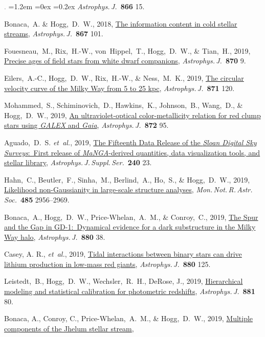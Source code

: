 \documentclass[10pt,letterpaper]{article}
\newcommand{\foreign}[1]{\textsl{#1}}
\newcommand{\etal}{\foreign{et~al.}}
\newcommand{\project}[1]{\textsl{#1}}
\newcommand{\doi}[2]{\href{http://dx.doi.org/#1}{{#2}}}
\newcommand{\deemph}[1]{\textcolor{grey}{\footnotesize{#1}}}
\newcommand{\pubnumber}[1]{\deemph{{#1}.}}
\newcounter{refpubnum}
\newcommand{\hogglist}{%
    \rightmargin=0in
    \leftmargin=1.2em
    \topsep=0ex
    \partopsep=0pt
    \itemsep=0.2ex
    \parsep=0pt
    \itemindent=-1.0\leftmargin
    \listparindent=0.0\leftmargin
    \settowidth{\labelsep}{~}
    \usecounter{refpubnum}
  }
\begin{document}
\begin{list}{\pubnumber{\therefpubnum}}{\hogglist}
\textit{Astrophys.\,J.}\ \textbf{866} 15.
\item
Bonaca,~A. \& Hogg,~D.~W., 2018,
\doi{10.3847/1538-4357/aae4da}{The information content in cold stellar streams},
\textit{Astrophys.\,J.}\ \textbf{867} 101.
\item
Fouesneau,~M., Rix,~H.-W., von~Hippel,~T., Hogg,~D.~W., \& Tian,~H., 2019,
\doi{10.3847/1538-4357/aaee74}{Precise ages of field stars from white dwarf companions},
\textit{Astrophys.\,J.}\ \textbf{870} 9.
\item
Eilers,~A.-C., Hogg,~D.~W., Rix,~H.-W., \& Ness,~M.~K., 2019,
\doi{10.3847/1538-4357/aaf648}{The circular velocity curve of the Milky Way from 5 to 25 kpc},
\textit{Astrophys.\,J.}\ \textbf{871} 120.
\item
Mohammed,~S., Schiminovich,~D., Hawkins,~K., Johnson,~B., Wang,~D., \& Hogg,~D.~W., 2019,
\doi{10.3847/1538-4357/aaf236}{An ultraviolet-optical color-metallicity relation for red clump stars using \project{GALEX} and \project{Gaia}},
\textit{Astrophys.\,J.}\ \textbf{872} 95.
\item
Aguado,~D.~S. \etal, 2019,
\doi{10.3847/1538-4365/aaf651}{The Fifteenth Data Release of the \project{Sloan Digital Sky Surveys}:\ First release of \project{MaNGA}-derived quantities, data visualization tools, and stellar library},
\textit{Astrophys.\,J.\,Suppl.\,Ser.}\ \textbf{240} 23.
\item
Hahn,~C., Beutler,~F., Sinha,~M., Berlind,~A., Ho,~S., \& Hogg,~D.~W., 2019,
\doi{10.1093/mnras/stz558}{Likelihood non-Gaussianity in large-scale structure analyses},
\textit{Mon.\,Not.\,R.\,Astr.\,Soc.}\ \textbf{485} 2956--2969.
\item
Bonaca,~A., Hogg,~D.~W., Price-Whelan,~A.~M., \& Conroy,~C., 2019,
\doi{10.3847/1538-4357/ab2873}{The Spur and the Gap in GD-1:\ Dynamical evidence for a dark substructure in the Milky Way halo},
\textit{Astrophys.\,J.}\ \textbf{880} 38.
\item
Casey, A. R., \etal, 2019,
\doi{10.3847/1538-4357/ab27bf}{Tidal interactions between binary stars can drive lithium production in low-mass red giants},
\textit{Astrophys.\,J.}\ \textbf{880} 125.
\item
Leistedt,~B., Hogg,~D.~W., Wechsler,~R.~H., DeRose, J., 2019,
\doi{10.3847/1538-4357/ab2d29}{Hierarchical modeling and statistical calibration for photometric redshifts},
\textit{Astrophys.\,J.}\ \textbf{881} 80.
\item
Bonaca, A., Conroy, C., Price-Whelan,~A.~M., \& Hogg,~D.~W., 2019,
\doi{10.3847/2041-8213/ab36ba}{Multiple components of the Jhelum stellar stream},

\end{list}
\end{document}
